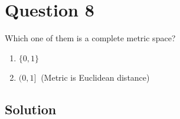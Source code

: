\section*{Question 8}

Which one of them is a complete metric space?
\begin{enumerate}[noitemsep, nolistsep, label= (\alph*)]
    \item \( \{ 0,1 \} \)
    \item \( ( 0,1 ] \ \) (Metric is Euclidean distance)
\end{enumerate}

\subsection*{Solution}
